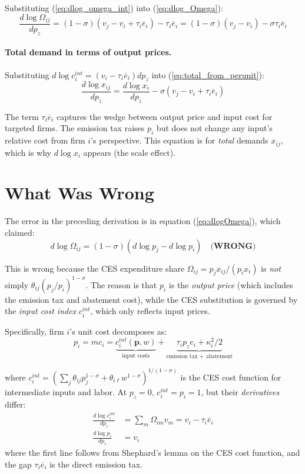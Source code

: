 \documentclass[11pt]{article}
\begin{document}
Substituting (\ref{eq:dlog_omega_int}) into (\ref{eq:dlog_Omega}):
\begin{equation}
    \label{eq:dlog_Omega_correct}
    \frac{d\log\Omega_{ij}}{dp_z} = (1-\sigma)(v_j - v_i + \tau_i\overline{e}_i) - \tau_i\overline{e}_i = (1-\sigma)(v_j - v_i) - \sigma\tau_i\overline{e}_i
\end{equation}

\paragraph{Total demand in terms of output prices.} Substituting $d\log c_i^{int} = (v_i - \tau_i\overline{e}_i)dp_z$ into (\ref{eq:total_from_perunit}):
\begin{equation}
    \label{eq:cesdemand_derived}
    \frac{d\log x_{ij}}{dp_z} = \frac{d\log x_i}{dp_z} - \sigma(v_j - v_i + \tau_i\overline{e}_i)
\end{equation}

The term $\tau_i\overline{e}_i$ captures the wedge between output price and input cost for targeted firms. The emission tax raises $p_i$ but does not change any input's relative cost from firm $i$'s perspective. This equation is for \textit{total} demands $x_{ij}$, which is why $d\log x_i$ appears (the scale effect).


\section{What Was Wrong}

The error in the preceding derivation is in equation (\ref{eq:dlogOmega}), which claimed:
$$d\log \Omega_{ij} = (1-\sigma)(d\log p_j - d\log p_i) \quad \textbf{(WRONG)}$$

This is wrong because the CES expenditure share $\Omega_{ij} = p_j x_{ij}/(p_i x_i)$ is \textit{not} simply $\theta_{ij}(p_j/p_i)^{1-\sigma}$. The reason is that $p_i$ is the \textit{output price} (which includes the emission tax and abatement cost), while the CES substitution is governed by the \textit{input cost index} $c_i^{int}$, which only reflects input prices.

Specifically, firm $i$'s unit cost decomposes as:
$$p_i = mc_i = \underbrace{c_i^{int}(\mathbf{p}, w)}_{\text{input costs}} + \underbrace{\tau_i p_z e_i + \kappa_i^2/2}_{\text{emission tax + abatement}}$$

where $c_i^{int} = (\sum_j \theta_{ij} p_j^{1-\sigma} + \theta_{i\ell} w^{1-\sigma})^{1/(1-\sigma)}$ is the CES cost function for intermediate inputs and labor. At $p_z = 0$, $c_i^{int} = p_i = 1$, but their \textit{derivatives} differ:
\begin{align*}
    \frac{d\log c_i^{int}}{dp_z} &= \sum_{m} \Omega_{im} v_m = v_i - \tau_i\overline{e}_i \\
    \frac{d\log p_i}{dp_z} &= v_i
\end{align*}
where the first line follows from Shephard's lemma on the CES cost function, and the gap $\tau_i\overline{e}_i$ is the direct emission tax.
\end{document}
